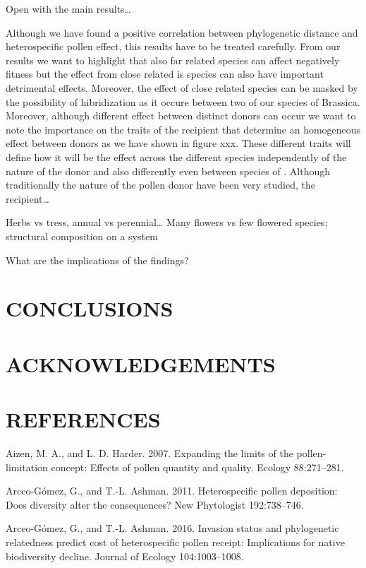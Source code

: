 \documentclass[11pt,a4paper]{article}
\begin{document}
Open with the main results\ldots{}

Although we have found a positive correlation between phylogenetic
distance and heterospecific pollen effect, this results have to be
treated carefully. From our results we want to highlight that also far
related species can affect negatively fitness but the effect from close
related is species can also have important detrimental effects.
Moreover, the effect of close related species can be masked by the
possibility of hibridization as it occure between two of our species of
Brassica. Moreover, although different effect between distinct donors
can occur we want to note the importance on the traits of the recipient
that determine an homogeneous effect between donors as we have shown in
figure xxx. These different traits will define how it will be the effect
across the different species independently of the nature of the donor
and also differently even between species of . Although traditionally
the nature of the pollen donor have been very studied, the
recipient\ldots{}

Herbs vs tress, annual vs perennial\ldots{} Many flowers vs few flowered
species; structural composition on a system

What are the implications of the findings?

\section{CONCLUSIONS}\label{conclusions}

\section{ACKNOWLEDGEMENTS}\label{acknowledgements}

\section{REFERENCES}\label{references}

\hypertarget{refs}{}
\hypertarget{ref-aizen2007}{}
Aizen, M. A., and L. D. Harder. 2007. Expanding the limits of the
pollen-limitation concept: Effects of pollen quantity and quality.
Ecology 88:271--281.

\hypertarget{ref-arceo2011}{}
Arceo-Gómez, G., and T.-L. Ashman. 2011. Heterospecific pollen
deposition: Does diversity alter the consequences? New Phytologist
192:738--746.

\hypertarget{ref-arceo2016}{}
Arceo-Gómez, G., and T.-L. Ashman. 2016. Invasion status and
phylogenetic relatedness predict cost of heterospecific pollen receipt:
Implications for native biodiversity decline. Journal of Ecology
104:1003--1008.
\end{document}
